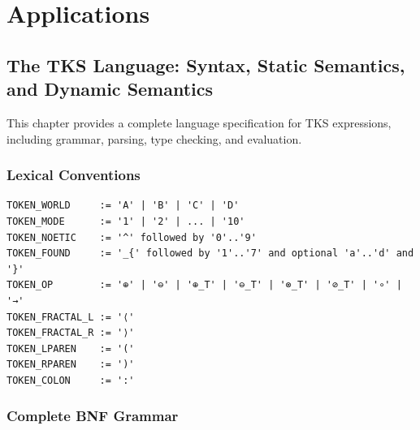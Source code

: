 
\part{Applications}

\chapter{The TKS Language: Syntax, Static Semantics, and Dynamic Semantics}
\label{ch:language-spec}

This chapter provides a complete language specification for TKS expressions, including grammar, parsing, type checking, and evaluation.

\section{Lexical Conventions}

\begin{definition}
\label{def:tokens}
\begin{verbatim}
TOKEN_WORLD     := 'A' | 'B' | 'C' | 'D'
TOKEN_MODE      := '1' | '2' | ... | '10'
TOKEN_NOETIC    := '^' followed by '0'..'9'
TOKEN_FOUND     := '_{' followed by '1'..'7' and optional 'a'..'d' and '}'
TOKEN_OP        := '⊕' | '⊖' | '⊕_T' | '⊖_T' | '⊗_T' | '⊘_T' | '∘' | '→'
TOKEN_FRACTAL_L := '⟨'
TOKEN_FRACTAL_R := '⟩'
TOKEN_LPAREN    := '('
TOKEN_RPAREN    := ')'
TOKEN_COLON     := ':'
\end{verbatim}
\end{definition}

\section{Complete BNF Grammar}

